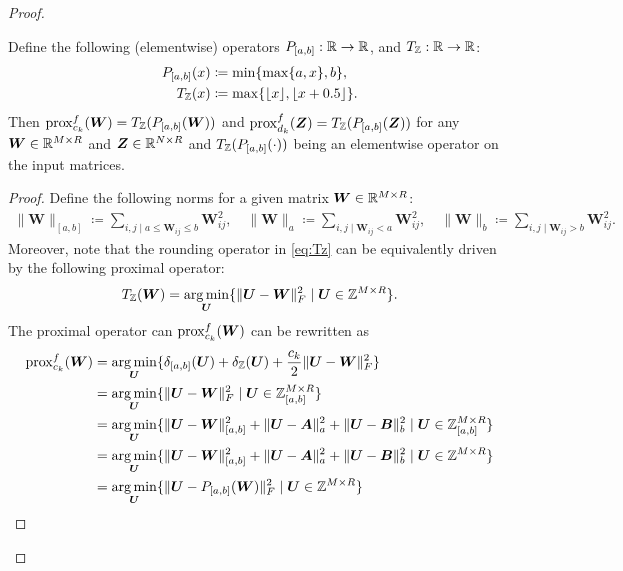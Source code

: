 \begin{proof}
    \begin{lem}
        Define the following (elementwise) operators $P_{[a,b]}:\mathbb{R}\rightarrow\mathbb{R}$, and $T_\mathbb Z:\mathbb{R}\rightarrow\mathbb{R}$:
        \begin{align}
            P_{[a,b]}(x) &\coloneqq \min\{\max\{a, x\}, b\},\\
            T_\mathbb Z(x) &\coloneqq \max\{\lfloor x \rfloor, \lfloor x+0.5 \rfloor\}. \label{eq:Tz}
        \end{align}
        Then $\operatorname{prox}^f_{c_k}(\bm W) = T_\mathbb Z(P_{[a,b]}(\bm W))$ and $\operatorname{prox}^f_{d_k}(\bm Z) = T_\mathbb Z(P_{[a,b]}(\bm Z))$ for any $\bm W\in \mathbb{R}^{M\times R}$ and $\bm Z\in\mathbb{R}^{N\times R}$ and $T_\mathbb Z(P_{[a,b]}(\cdot))$ being an elementwise operator on the input matrices.
    \end{lem}
    \begin{proof}
        Define the following norms for a given matrix $\bm W \in \mathbb{R}^{M\times R}$:
        \begin{align*}
            \|\bm W\|_{[a,b]} \coloneqq \sum_{i,j \mid a \leq \bm W_{ij} \leq b} \bm W_{ij}^2, \quad 
            \|\bm W\|_a \coloneqq \sum_{i,j \mid \bm W_{ij} < a} \bm W_{ij}^2, \quad 
            \|\bm W\|_b \coloneqq \sum_{i,j \mid \bm W_{ij} > b} \bm W_{ij}^2.
        \end{align*}
        Moreover, note that the rounding operator in \eqref{eq:Tz} can be equivalently driven by the following proximal operator:
        \begin{equation}
            T_\mathbb Z(\bm W) = \operatorname*{arg\,min}_{\bm U}\{\|\bm U - \bm W\|^2_F \mid \bm U \in \mathbb Z^{M\times R}\}.
            \label{eq:equivalence_prox_Tz}
        \end{equation}
        The proximal operator can $\operatorname{prox}^f_{c_k}(\bm W)$ can be rewritten as
        \begin{align*}
            \prox^f_{c_k}(\bm W) &= \argmin_{\bm U}\{\delta_{[a,b]}(\bm U) + \delta_{\Z}(\bm U) + \frac{c_k}{2} \|\bm U - \bm W\|^2_F\}\\
            &= \argmin_{\bm U}\{\|\bm U - \bm W\|^2_F \mid \bm U \in \Z_{[a,b]}^{M\times R}\}\\
            &= \argmin_{\bm U}\{\|\bm U - \bm W\|^2_{[a,b]} + \|\bm U - \bm A\|^2_a + \|\bm U - \bm B\|^2_b \mid \bm U \in \Z_{[a,b]}^{M\times R}\}\\
            &= \argmin_{\bm U}\{\|\bm U - \bm W\|^2_{[a,b]} + \|\bm U - \bm A\|^2_a + \|\bm U - \bm B\|^2_b \mid \bm U \in \Z^{M\times R}\}\\
            &= \argmin_{\bm U}\{\|\bm U - P_{[a,b]}(\bm W)\|^2_F \mid \bm U \in \Z^{M\times R}\}\\

\end{align*}
\end{proof}
\end{proof}
